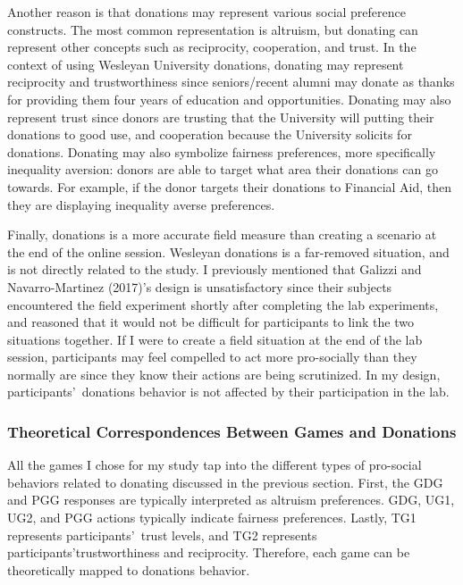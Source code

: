 \documentclass[12pt]{article}
\begin{document}
Another reason is that donations may represent various social preference constructs. The most common representation is altruism, but donating can represent other concepts such as reciprocity, cooperation, and trust. In the context of using Wesleyan University donations, donating may represent reciprocity and trustworthiness since seniors/recent alumni may donate as thanks for providing them four years of education and opportunities. Donating may also represent trust since donors are trusting that the University will putting their donations to good use, and cooperation because the University solicits for donations. {\color{blue} Donating may also symbolize fairness preferences, more specifically inequality aversion: donors are able to target what area their donations can go towards. For example, if the donor targets their donations to Financial Aid, then they are displaying inequality averse preferences.}

Finally, donations is a more accurate field measure than creating a scenario at the end of the online session. Wesleyan donations is a far-removed situation, and is not directly related to the study. I previously mentioned that Galizzi and Navarro-Martinez (2017)\rq s design is unsatisfactory since their subjects encountered the field experiment shortly after completing the lab experiments, and reasoned that it would not be difficult for participants to link the two situations together. If I were to create a field situation at the end of the lab session, participants may feel compelled to act more pro-socially than they normally are since they know their actions are being scrutinized. In my design, participants\rq \ donations behavior is not affected by their participation in the lab.

\subsubsection{Theoretical Correspondences Between Games and Donations}

All the games I chose for my study tap into the different types of pro-social behaviors related to donating discussed in the previous section. First, the GDG and PGG responses are typically interpreted as altruism preferences. GDG, UG1, UG2, and PGG actions typically indicate fairness preferences. Lastly, TG1 represents participants\rq \ trust levels, and TG2 represents participants\rq trustworthiness and reciprocity. Therefore, each game can be theoretically mapped to donations behavior.
	
\end{document}
